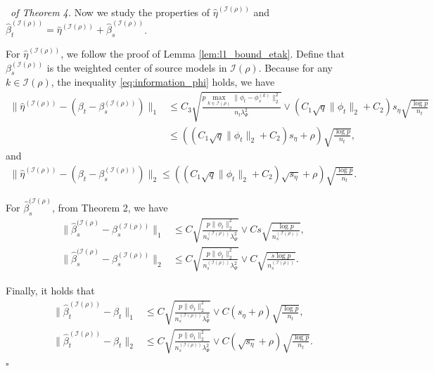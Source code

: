 \documentclass[12pt]{article}
\newenvironment{pf}{{\noindent \it Proof}\ }{\hfill $\square$\par}
\begin{document}
\begin{pf}{\it of Theorem 4. }
    Now we study the properties of $\hat{\eta}^{(\mathcal{I(\rho)})}$ and $\hat{\beta}_t^{(\mathcal{I}(\rho))} = \hat{\eta}^{(\mathcal{I(\rho)})} + \hat{\beta}_s^{(\mathcal{I}(\rho))}$. 

    For $\hat{\eta}^{(\mathcal{I(\rho)})}$, we follow the proof of Lemma \ref{lem:l1_bound_etak}. Define that $\beta_s^{(\mathcal{I}(\rho))}$ is the weighted center of source models in $\mathcal{I}(\rho)$. Because for any $k\in \mathcal{I}(\rho)$, the inequality \eqref{eq:information_phi} holds, we have
    \begin{align*}
        \|\hat{\eta}^{(\mathcal{I(\rho)})} - (\beta_t - \beta_s^{(\mathcal{I}(\rho))})\|_1 &\le  C_3 \sqrt{\frac{p\max_{k\in \mathcal{I}(\rho)}\|\phi_t - \phi_s^{(k)}\|^2_2}{n_t\lambda_\Psi^2}} \vee (C_1\sqrt{q}\|\phi_t\|_2+C_2)s_\eta\sqrt{\frac{\log p}{n_t}}\\&\le ((C_1\sqrt{q}\|\phi_t\|_2+C_2)s_\eta + \rho)\sqrt{\frac{\log p}{n_t}},
    \end{align*}
    and 
    \begin{align*}
        \|\hat{\eta}^{(\mathcal{I(\rho)})} - (\beta_t - \beta_s^{(\mathcal{I}(\rho))})\|_2 \le ((C_1\sqrt{q}\|\phi_t\|_2+C_2)\sqrt{s_\eta} +\rho)\sqrt{\frac{\log p}{n_t}}.
    \end{align*}

    For $\hat{\beta}_s^{(\mathcal{I}(\rho)}$, from Theorem 2, we have 
    \begin{align*}
        \|\hat{\beta}_s^{(\mathcal{I}(\rho)} - \beta_s^{(\mathcal{I}(\rho))}\|_1 &\le C\sqrt{\frac{p\|\phi_t\|_2^2 }{n_s^{(\mathcal{I}(\rho))}\lambda_\Psi^2}}\vee C s\sqrt{\frac{\log p}{n_s^{(\mathcal{I}(\rho))}}},\\
        \|\hat{\beta}_s^{(\mathcal{I}(\rho)} - \beta_s^{(\mathcal{I}(\rho))}\|_2 &\le C\sqrt{\frac{p\|\phi_t\|_2^2 }{n_s^{(\mathcal{I}(\rho))}\lambda_\Psi^2}}\vee C \sqrt{\frac{s\log p}{n_s^{(\mathcal{I}(\rho))}}}.
    \end{align*}

    Finally, it holds that
    \begin{align*}
        \|\hat{\beta}_t^{(\mathcal{I(\rho)})}  - \beta_t\|_1 &\le C\sqrt{\frac{p\|\phi_t\|_2^2 }{n_s^{(\mathcal{I}(\rho))}\lambda_\Psi^2}}\vee C (s_\eta +\rho)\sqrt{\frac{\log p}{n_t}},\\
        \|\hat{\beta}_t^{(\mathcal{I(\rho)})}  - \beta_t\|_2 &\le C\sqrt{\frac{p\|\phi_t\|_2^2 }{n_s^{(\mathcal{I}(\rho))}\lambda_\Psi^2}}\vee C (\sqrt{s_\eta}+\rho)\sqrt{\frac{\log p}{n_t}}.
    \end{align*}
\end{pf}
\end{document}
